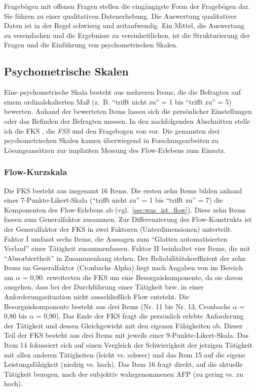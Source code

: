Fragebögen mit offenen Fragen stellen die eingängigste Form der Fragebögen dar. Sie führen zu einer qualitativen Datenerhebung. Die Auswertung qualitativer Daten ist in der Regel schwierig und zeitaufwendig. Ein Mittel, die Auswertung zu vereinfachen und die Ergebnisse zu vereinheitlichen, ist die Strukturierung der Fragen und die Einführung von psychometrischen Skalen.

\subsection{Psychometrische Skalen}
Eine psychometrische Skala besteht aus mehreren Items, die die Befragten auf einem ordinalskalierten Maß (z.~B. "`trifft nicht zu"' = 1 bis "`trifft zu"' = 5) bewerten. Anhand der bewerteten Items lassen sich die persönlicher Einstellungen oder das Befinden der Befragten messen. In den nachfolgenden Abschnitten stelle ich die \ac{FKS} \citep{Rheinberg2003}, die \emph{\ac{FSS}} \citep{Jackson1996} und den Fragebogen von \citet{Keller2008} vor. Die genannten drei psychometrischen Skalen kamen überwiegend in Forschungsarbeiten zu Lösungsansätzen zur impliziten Messung des Flow-Erlebens zum Einsatz.

\subsubsection{Flow-Kurzskala}

Die \ac{FKS} besteht aus insgesamt 16 Items. Die ersten zehn Items bilden anhand einer 7-Punkte-Likert-Skala ("`trifft nicht zu"' = 1 bis "`trifft zu"' = 7) die Komponenten des Flow-Erlebens ab (vgl.~\ref{sec:was_ist_flow}). Diese zehn Items fassen \citet{Rheinberg2003} zum Generalfaktor zusammen. Zur Differenzierung des Flow-Konstrukts ist der Generalfaktor der \ac{FKS} in zwei Faktoren (Unterdimensionen) unterteilt. Faktor I umfasst sechs Items, die Aussagen zum "`Glatten automatisierten Verlauf"' einer Tätigkeit zusammenfassen. Faktor II beinhaltet vier Items, die mit "`Absorbiertheit"' in Zusammenhang stehen. Der Reliabilitätskoeffizient der zehn Items im Generalfaktor (Cronbachs Alpha) liegt nach Angaben von \citet[S.~9]{Rheinberg2003} im Bereich um $\alpha$ = 0,90. \citet{Rheinberg2003} erweiterten die \ac{FKS} um eine Besorgniskomponente, da sie davon ausgehen, dass bei der Durchführung einer Tätigkeit bzw. in einer Anforderungssituation nicht ausschließlich Flow entsteht. Die Besorgniskomponente besteht aus drei Items (Nr. 11 bis Nr. 13, Cronbachs $\alpha$ = 0,80 bis $\alpha$ = 0,90). Das Ende der \ac{FKS} fragt die persönlich erlebte Anforderung der Tätigkeit und dessen Gleichgewicht mit den eigenen Fähigkeiten ab. Dieser Teil der \ac{FKS} besteht aus drei Items mit jeweils einer 9-Punkte-Likert-Skala. Das Item 14 fokussiert sich auf einen Vergleich der Schwierigkeit der jetzigen Tätigkeit mit allen anderen Tätigkeiten (leicht vs. schwer) und das Item 15 auf die eigene Leistungsfähigkeit (niedrig vs. hoch). Das Item 16 fragt direkt, auf die aktuelle Tätigkeit bezogen, nach der subjektiv wahrgenommenen \ac{AFP} (zu gering vs. zu hoch).

